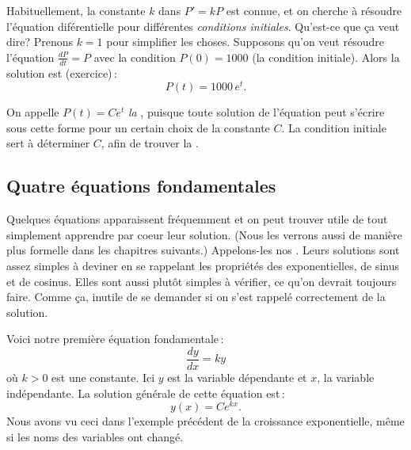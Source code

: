 Habituellement, la constante $k$ dans $P' = kP$ est connue, et on cherche \`a r\'esoudre l'\'equation dif\'erentielle pour diff\'erentes \emph{conditions initiales}.  Qu'est-ce que \c{c}a veut dire?  Prenons $k=1$ pour simplifier les choses.  Supposons qu'on veut r\'esoudre l'\'equation 
$\frac{dP}{dt} = P$ 
avec la condition $P(0) = 1000$ (la condition initiale).
Alors la solution est (exercice)\,: 
\begin{equation*}
P(t) = 1000 \, e^t .
\end{equation*}

On appelle $P(t) = C e^t$ \emph{la },
puisque toute solution de l'\'equation peut s'\'ecrire sous cette forme pour un certain choix de la constante $C$.  La condition initiale sert \`a d\'eterminer $C$, afin de trouver la 
\emph{}.  

\subsection{Quatre \'equations fondamentales} \label{subsection:fourfundamental}

Quelques \'equations apparaissent fr\'equemment et on peut trouver utile de tout simplement apprendre par coeur leur solution.  (Nous les verrons aussi de mani\`ere plus formelle dans les chapitres suivants.)  Appelons-les nos . Leurs solutions sont assez simples \`a deviner en se rappelant les propri\'et\'es des exponentielles, de sinus et de cosinus.  Elles sont aussi plut\^ot simples \`a v\'erifier, ce qu'on devrait toujours faire.  Comme \c{c}a, inutile de se demander si on s'est rappel\'e correctement de la solution.

\medskip

Voici notre premi\`ere \'equation fondamentale\,: 
\begin{equation*}
\frac{dy}{dx} = k y 
\end{equation*}
o\`u $k > 0$ est une constante.
Ici $y$ est la variable d\'ependante et $x$, la variable ind\'ependante.
La solution g\'en\'erale de cette \'equation est\,: 
\begin{equation*}
y(x) = C e^{kx} .
\end{equation*}
Nous avons vu ceci dans l'exemple pr\'ec\'edent de la croissance exponentielle, m\^eme si les noms des variables ont chang\'e.


